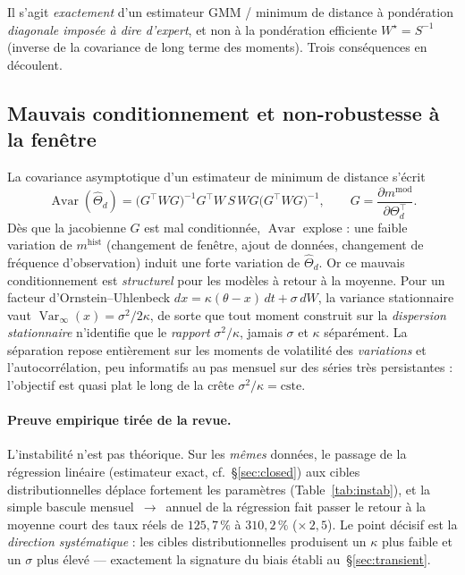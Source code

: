 \documentclass[11pt,a4paper]{article}
\theoremstyle{definition}
\DeclareMathOperator{\Var}{Var}
\DeclareMathOperator{\Avar}{Avar}
\newcommand{\transp}{^{\!\top}}
\begin{document}
\noindent Il s'agit \emph{exactement} d'un estimateur GMM / minimum de distance à pondération \emph{diagonale imposée à dire d'expert}, et non à la pondération efficiente $W^\star=S^{-1}$ (inverse de la covariance de long terme des moments). Trois conséquences en découlent.

\subsection{Mauvais conditionnement et non-robustesse à la fenêtre}

La covariance asymptotique d'un estimateur de minimum de distance s'écrit
\[
\Avar(\hat\Theta_d)=\big(G\transp W G\big)^{-1}G\transp W\,S\,W G\big(G\transp W G\big)^{-1},
\qquad G=\frac{\partial m^{\mathrm{mod}}}{\partial\Theta_d\transp}.
\]
Dès que la jacobienne $G$ est mal conditionnée, $\Avar$ explose : une faible variation de $m^{\mathrm{hist}}$ (changement de fenêtre, ajout de données, changement de fréquence d'observation) induit une forte variation de $\hat\Theta_d$. Or ce mauvais conditionnement est \emph{structurel} pour les modèles à retour à la moyenne. Pour un facteur d'Ornstein--Uhlenbeck $dx=\kappa(\theta-x)\,dt+\sigma\,dW$, la variance stationnaire vaut $\Var_\infty(x)=\sigma^2/2\kappa$, de sorte que tout moment construit sur la \emph{dispersion stationnaire} n'identifie que le \emph{rapport} $\sigma^2/\kappa$, jamais $\sigma$ et $\kappa$ séparément. La séparation repose entièrement sur les moments de volatilité des \emph{variations} et l'autocorrélation, peu informatifs au pas mensuel sur des séries très persistantes : l'objectif est quasi plat le long de la crête $\sigma^2/\kappa=\text{cste}$.

\paragraph{Preuve empirique tirée de la revue.} L'instabilité n'est pas théorique. Sur les \emph{mêmes} données, le passage de la régression linéaire (estimateur exact, cf.\ \S\ref{sec:closed}) aux cibles distributionnelles déplace fortement les paramètres (Table~\ref{tab:instab}), et la simple bascule mensuel~$\to$~annuel de la régression fait passer le retour à la moyenne court des taux réels de $125{,}7\,\%$ à $310{,}2\,\%$ ($\times\,2{,}5$). Le point décisif est la \emph{direction systématique} : les cibles distributionnelles produisent un $\kappa$ plus faible et un $\sigma$ plus élevé --- exactement la signature du biais établi au~\S\ref{sec:transient}.
\end{document}
